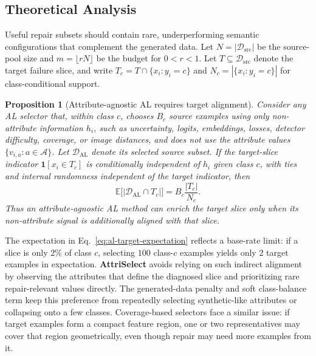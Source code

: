 \documentclass{article}
\newcommand{\modelname}{AttriSelect}
\newcommand{\model}{\textcolor{darkteal}{\textbf{\modelname}}\xspace}
\newcommand{\dataset}{\mathcal{D}}
\newcommand{\attrs}{\mathcal{A}}
\newtheorem{proposition}{Proposition}
\begin{document}
\subsection{Theoretical Analysis}
\label{subsec:slice-enrichment}

Useful repair subsets should contain rare, underperforming semantic configurations that complement the generated data. Let $N=|\dataset_{\mathrm{src}}|$ be the source-pool size and $m=\lfloor rN\rfloor$ be the budget for $0<r<1$. Let $T\subseteq\dataset_{\mathrm{src}}$ denote the target failure slice, and write $T_c=T\cap\{x_i:y_i=c\}$ and $N_c=|\{x_i:y_i=c\}|$ for class-conditional support.

\begin{tcolorbox}[
    colback=blue!2!white,
    colframe=blue!20!white,
    arc=3pt,
    boxrule=1pt,
    drop shadow,
    breakable
]
\begin{proposition}[Attribute-agnostic AL requires target alignment]
\label{prop:al-target-alignment}
Consider any AL selector that, within class $c$, chooses $B_c$ source examples using only non-attribute information $h_i$, such as uncertainty, logits, embeddings, losses, detector difficulty, coverage, or image distances, and does not use the attribute values $\{v_{i,a}:a\in\attrs\}$. Let $\dataset_{\mathrm{AL}}$ denote its selected source subset. If the target-slice indicator $\mathbf{1}[x_i\in T_c]$ is conditionally independent of $h_i$ given class $c$, with ties and internal randomness independent of the target indicator, then
\begin{equation}
\label{eq:al-target-expectation}
\mathbb{E}\big[|\dataset_{\mathrm{AL}}\cap T_c|\big]
=
B_c\frac{|T_c|}{N_c}.
\end{equation}
Thus an attribute-agnostic AL method can enrich the target slice only when its non-attribute signal is additionally aligned with that slice.
\end{proposition}
\end{tcolorbox}

The expectation in Eq.~\ref{eq:al-target-expectation} reflects a base-rate limit: if a slice is only $2\%$ of class $c$, selecting $100$ class-$c$ examples yields only $2$ target examples in expectation. \model avoids relying on such indirect alignment by observing the attributes that define the diagnosed slice and prioritizing rare repair-relevant values directly. The generated-data penalty and soft class-balance term keep this preference from repeatedly selecting synthetic-like attributes or collapsing onto a few classes. Coverage-based selectors face a similar issue: if target examples form a compact feature region, one or two representatives may cover that region geometrically, even though repair may need more examples from it.
\end{document}
